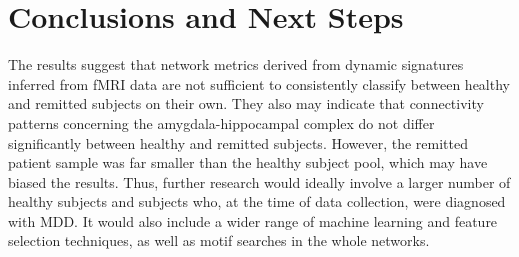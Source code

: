 \documentclass[12pt]{report}
\begin{document}
		\chapter{Conclusions and Next Steps}
		The results suggest that network metrics derived from dynamic signatures inferred from fMRI data are not sufficient to consistently classify between healthy and remitted subjects on their own. They also may indicate that connectivity patterns concerning the amygdala-hippocampal complex do not differ significantly between healthy and remitted subjects. However, the remitted patient sample was far smaller than the healthy subject pool, which may have biased the results. Thus, further research would ideally involve a larger number of healthy subjects and subjects who, at the time of data collection, were diagnosed with MDD. It would also include a wider range of machine learning and feature selection techniques, as well as motif searches in the whole networks.
		


\end{document}
